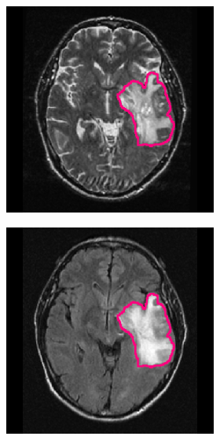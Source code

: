 \begin{subappendices}
\begin{figure}[htbp]
\begin{subfigure}[b]{0.8\textwidth}
\begin{subfigure}[b]{0.215\textwidth}
        \end{subfigure}
        \hfill
        \begin{subfigure}[b]{0.215\textwidth}
        \includegraphics[width=\textwidth, clip, trim=2.5cm 0.5cm 2.5cm 0.5cm]{Figures/Random_segs/T2_TCGA-08-0353.png}
        \end{subfigure}
        \hfill
        \begin{subfigure}[b]{0.215\textwidth}
        \includegraphics[width=\textwidth, clip, trim=2.5cm 0.5cm 2.5cm 0.5cm]{Figures/Random_segs/FLAIR_TCGA-08-0353.png}

\end{subfigure}
\end{subfigure}
\end{figure}
\end{subappendices}
